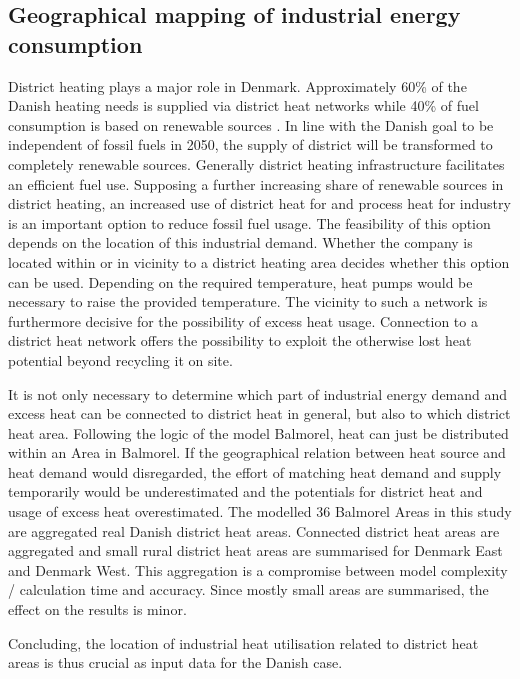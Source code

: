 \documentclass[review]{elsarticle}
\begin{document}

\subsection{Geographical mapping of industrial energy consumption}

District heating plays a major role in Denmark. Approximately 60\% of the Danish heating needs is supplied via district heat networks while 40\% of fuel consumption is based on renewable sources \cite{Munster2012}. In line with the Danish goal to be independent of fossil fuels in 2050, the supply of district will be transformed to completely renewable sources. Generally district heating infrastructure facilitates an efficient fuel use. Supposing a further increasing share of renewable sources in district heating, an increased use of district heat for and process heat for industry is an important option to reduce fossil fuel usage. The feasibility of this option depends on the location of this industrial demand. Whether the company is located within or in vicinity to a district heating area decides whether this option can be used. Depending on the required temperature, heat pumps would be necessary to raise the provided temperature. The vicinity to such a network is furthermore decisive for the possibility of excess heat usage. Connection to a district heat network offers the possibility to exploit the otherwise lost heat potential beyond recycling it on site.

It is not only necessary to determine which part of industrial energy demand and excess heat can be connected to district heat in general, but also to which district heat area. Following the logic of the model Balmorel, heat can just be distributed within an Area in Balmorel. If the geographical relation between heat source and heat demand would disregarded, the effort of matching heat demand and supply temporarily would be underestimated and the potentials for district heat and usage of excess heat overestimated. The modelled 36 Balmorel Areas in this study are aggregated real Danish district heat areas. Connected district heat areas are aggregated and small rural district heat areas are summarised for Denmark East and Denmark West. This aggregation is a compromise between model complexity / calculation time and accuracy. Since mostly small areas are summarised, the effect on the results is minor.

Concluding, the location of industrial heat utilisation related to district heat areas is thus crucial as input data for the Danish case.
\end{document}
